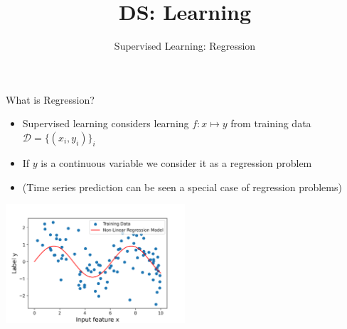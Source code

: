 \documentclass[aspectratio=169]{../latex_main/tntbeamer}  %
\title[Regression]{DS: Learning}
\subtitle{Supervised Learning: Regression}
\begin{document}
	
    \maketitle
    
    \begin{frame}[c]{What is Regression?}
        \begin{itemize}
            \item Supervised learning considers learning $f: x \mapsto y$ from training data $\mathcal{D}= \{(x_i,y_i)\}_{i}$ 
            \item If $y$ is a continuous variable we consider it as a regression problem
            \item (Time series prediction can be seen a special case of regression problems)
        \end{itemize} 

        \centering
        \includegraphics[width=0.5\textwidth]{figure/nonlinear_regression}

        
        
        
        


    \end{frame}
\end{document}
